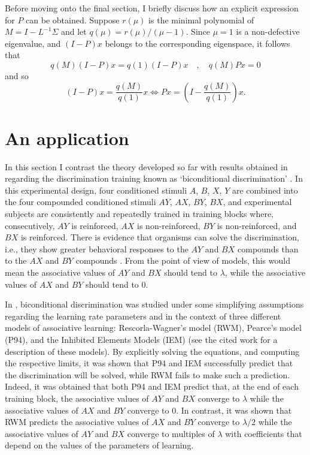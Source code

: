 \documentclass[]{interact}
\theoremstyle{plain}%
\theoremstyle{definition}
\theoremstyle{remark}
\newcommand{\quot}[1]{`#1'}
\begin{document}
Before moving onto the final section, I briefly discuss how an explicit expression for $P$ can be obtained. Suppose $r(\mu)$ is the minimal polynomial of $M=I-L^{-1}\Sigma$ and let $q(\mu)=r(\mu)/(\mu-1)$. Since $\mu=1$ is a non-defective eigenvalue, and $(I-P)x$ belongs to the corresponding eigenspace, it follows that 
\[
q(M)(I-P)x=q(1)(I-P)x \quad , \quad q(M)Px=0
\]
and so
\[
(I-P)x=\frac{q(M)}{q(1)}x \Leftrightarrow  Px=\left( I-\frac{q(M)}{q(1)}\right) x.
\]

\section{An application}\label{application}

In this section I contrast the theory developed so far with results obtained in \cite{A24} regarding the discrimination training known as \quot{biconditional discrimination} \cite{S75}. In this experimental design, four conditioned stimuli $A$, $B$, $X$, $Y$ are combined into the four compounded conditioned stimuli $AY$, $AX$, $BY$, $BX$, and experimental subjects are consistently and repeatedly trained in training blocks where, consecutively, $AY$ is reinforced, $AX$ is non-reinforced, $BY$ is non-reinforced, and $BX$ is reinforced.
There is evidence that organisms can solve the discrimination, i.e., they show greater behavioral responses to the $AY$ and $BX$ compounds than to the $AX$ and $BY$ compounds \cite{S75}. From the point of view of models, this would mean the associative values of $AY$ and $BX$ should tend to $\lambda$, while the associative values of $AX$ and $BY$ should tend to $0$.

In \cite{A24}, biconditional discrimination was studied under some simplifying assumptions regarding the learning rate parameters and in the context of three different models of associative learning: Rescorla-Wagner's model (RWM), Pearce's model (P94), and the Inhibited Elements Models (IEM) (see the cited work for a description of these models). By explicitly solving the equations, and computing the respective limits, it was shown that P94 and IEM successfully predict that the discrimination will be solved, while RWM fails to make such a prediction. Indeed, it was obtained that both P94 and IEM predict that, at the end of each training block, the associative values of $AY$ and $BX$ converge to $\lambda$ while the associative values of $AX$ and $BY$ converge to $0$. In contrast, it was shown that RWM predicts the associative values of $AX$ and $BY$ converge to $\lambda/2$ while the associative values of $AY$ and $BX$ converge to multiples of $\lambda$ with coefficients that depend on the values of the parameters of learning. 
\end{document}
